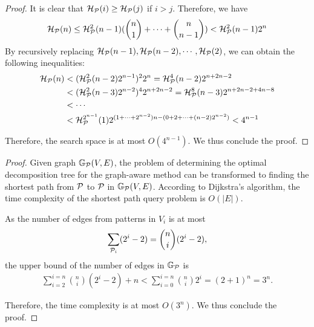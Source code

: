 {\begin{proof}
    It is clear that $\mathcal{H}_{\mathcal{P}}(i) \geq \mathcal{H}_{\mathcal{P}}(j)$ if $i > j$.
    Therefore, we have
    \begin{equation*}
        \mathcal{H}_{\mathcal{P}}(n) \leq \mathcal{H}^{2}_{\mathcal{P}}(n-1)(\binom{n}{1} + \cdots + \binom{n}{n-1}) < \mathcal{H}^{2}_{\mathcal{P}}(n-1)2^{n}
    \end{equation*}
    By recursively replacing $\mathcal{H}_{\mathcal{P}}(n-1), \mathcal{H}_{\mathcal{P}}(n-2), \cdots, \mathcal{H}_{\mathcal{P}}(2)$, we can obtain the following inequalities:
    \begin{equation*}
        \begin{split}
            \mathcal{H}_{\mathcal{P}}(n) & < (\mathcal{H}^{2}_{\mathcal{P}}(n-2)2^{n-1})^22^n = \mathcal{H}^{4}_{\mathcal{P}}(n-2)2^{n+2n-2} \\
            & < (\mathcal{H}^{2}_{\mathcal{P}}(n-3)2^{n-2})^42^{n+2n-2} = \mathcal{H}^{8}_{\mathcal{P}}(n-3)2^{n+2n-2 + 4n-8} \\
            & < \cdots \\
            & < \mathcal{H}^{2^{n-1}}_{\mathcal{P}}(1)2^{(1+\cdots+2^{n-2})n - (0+ 2 + \cdots + (n-2)2^{n-2})} < 4^{n-1}
        \end{split}
    \end{equation*}

    Therefore, the search space is at most $O(4^{n-1})$.
    We thus conclude the proof.
\end{proof}



    \begin{proof}
        Given graph $\mathbb{G}_{\mathcal{P}}(V, E)$, the problem of determining the optimal decomposition tree for the graph-aware method can be transformed to finding the shortest path from $\mathcal{P}$ to $\pattern_{\empty}$ in $\mathbb{G}_{\mathcal{P}}(V, E)$.
        According to Dijkstra's algorithm, the time complexity of the shortest path query problem is $O(|E|)$.

        As the number of edges from patterns in $V_i$ is at most
        \begin{equation*}
            \sum\limits_{\mathcal{P}_i}(2^i - 2) = \binom{n}{i}(2^i - 2),
        \end{equation*}
        the upper bound of the number of edges in $\mathbb{G}_{\mathcal{P}}$ is
        \begin{equation*}
            \begin{split}
                \sum\limits_{i=2}^{i=n}\binom{n}{i}(2^i - 2) + n
                < \sum\limits_{i=0}^{i=n}\binom{n}{i}2^i = (2+1)^n
                 = 3^n.
            \end{split}
        \end{equation*}

        Therefore, the time complexity is at most $O(3^n)$.
        We thus conclude the proof.
    \end{proof}
}

